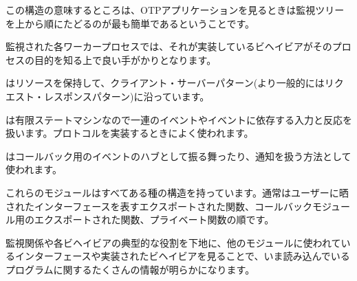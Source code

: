 この構造の意味するところは、OTPアプリケーションを見るときは監視ツリーを上から順にたどるのが最も簡単であるということです。

監視された各ワーカープロセスでは、それが実装しているビヘイビアがそのプロセスの目的を知る上で良い手がかりとなります。

\begin{itemize*}
  \item {} はリソースを保持して、クライアント・サーバーパターン(より一般的にはリクエスト・レスポンスパターン)に沿っています。
  \item {} は有限ステートマシンなので一連のイベントやイベントに依存する入力と反応を扱います。プロトコルを実装するときによく使われます。
  \item {} はコールバック用のイベントのハブとして振る舞ったり、通知を扱う方法として使われます。
\end{itemize*}

これらのモジュールはすべてある種の構造を持っています。通常はユーザーに晒されたインターフェースを表すエクスポートされた関数、コールバックモジュール用のエクスポートされた関数、プライベート関数の順です。

監視関係や各ビヘイビアの典型的な役割を下地に、他のモジュールに使われているインターフェースや実装されたビヘイビアを見ることで、いま読み込んでいるプログラムに関するたくさんの情報が明らかになります。


